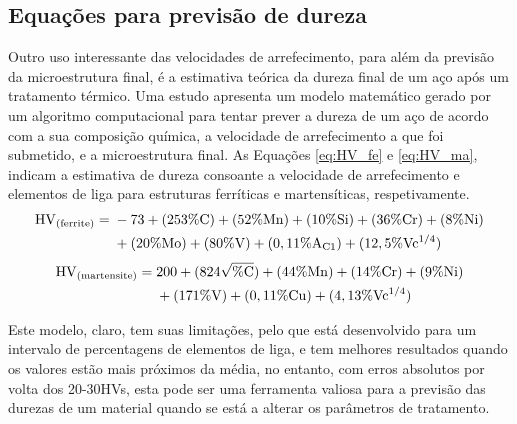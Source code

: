 \subsection{Equações para previsão de dureza}\label{ssec:previsao_dureza}
Outro uso interessante das velocidades de arrefecimento, para além da previsão da microestrutura final, é a estimativa teórica da dureza final de um aço após um tratamento térmico. Uma estudo apresenta um modelo matemático gerado por um algoritmo computacional para tentar prever a dureza de um aço de acordo com a sua composição química, a velocidade de arrefecimento a que foi submetido, e a microestrutura final\cite{Trzaska2016}. As Equações \ref{eq:HV_fe} e \ref{eq:HV_ma}, indicam a estimativa de dureza consoante a velocidade de arrefecimento e elementos de liga para estruturas ferríticas e martensíticas, respetivamente.
\begin{equation}
    \begin{aligned}
    \mathrm{HV\textsubscript{(ferrite)}} = {}   & -73 + (253\%\mathrm{C}) + (52\%\mathrm{Mn}) + (10\%\mathrm{Si}) + (36\%\mathrm{Cr}) + (8\%\mathrm{Ni})\\
                                                & + (20\%\mathrm{Mo}) + (80\%\mathrm{V}) + (0,11\%\mathrm{A\textsubscript{C1}}) + (12,5\%\mathrm{Vc\textsuperscript{1/4}})
    \end{aligned}
    \label{eq:HV_fe}
\end{equation}
\begin{equation}
    \begin{aligned}
    \mathrm{HV\textsubscript{(martensite)}} = {}    & 200 + (824\sqrt{\%\mathrm{C}}) + (44\%\mathrm{Mn}) + (14\%\mathrm{Cr}) + (9\%\mathrm{Ni})\\
                                                    &+ (171\%\mathrm{V}) + (0,11\%\mathrm{Cu}) + (4,13\%\mathrm{Vc\textsuperscript{1/4}})
    \end{aligned}
    \label{eq:HV_ma}
\end{equation}
\par
Este modelo, claro, tem suas limitações, pelo que está desenvolvido para um intervalo de percentagens de elementos de liga, e tem melhores resultados quando os valores estão mais próximos da média, no entanto, com erros absolutos por volta dos 20-30HVs, esta pode ser uma ferramenta valiosa para a previsão das durezas de um material quando se está a alterar os parâmetros de tratamento. 

